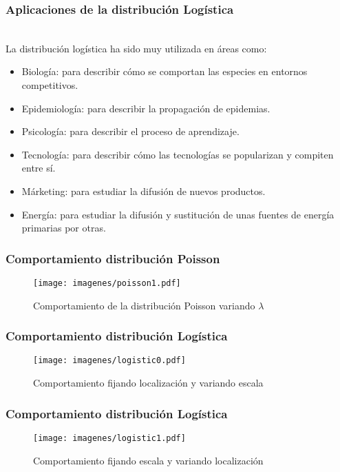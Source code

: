 \documentclass[12pt]{beamer}
\begin{document}
\begin{frame}
\frametitle{Aplicaciones de la distribución Logística}
~\\ La distribución logística ha sido muy utilizada en áreas como:
\begin{itemize}
\item Biología: para describir cómo se comportan las especies en entornos competitivos.
\item Epidemiología: para describir la propagación de epidemias.
\item Psicología: para describir el proceso de aprendizaje.
\item Tecnología: para describir cómo las tecnologías se popularizan y compiten entre sí.
\item Márketing: para estudiar la difusión de nuevos productos.
\item Energía: para estudiar la difusión y sustitución de unas fuentes de energía primarias por otras.
\end{itemize}
\end{frame}

\begin{frame}
\frametitle{Comportamiento distribución Poisson}
\begin{figure}[!h]
    \begin{center}
        \texttt{[image: imagenes/poisson1.pdf]}
        \caption{Comportamiento de la distribución Poisson variando $\lambda$}
        \label{fig:Densidad}
    \end{center}
\end{figure}
\end{frame}

\begin{frame}
\frametitle{Comportamiento distribución Logística}
\begin{figure}[!h]
    \begin{center}
        \texttt{[image: imagenes/logistic0.pdf]}
        \caption{Comportamiento fijando localización y variando escala}
        \label{fig:Densidad}
    \end{center}
\end{figure}
\end{frame}

\begin{frame}
\frametitle{Comportamiento distribución Logística}
\begin{figure}[!h]
    \begin{center}
        \texttt{[image: imagenes/logistic1.pdf]}
        \caption{Comportamiento fijando escala y variando localización}
        \label{fig:Densidad}
    \end{center}
\end{figure}
\end{frame}
\end{document}
